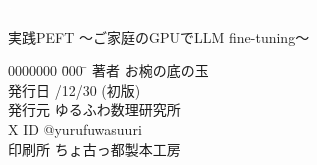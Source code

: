 \documentclass[a5paper,twoside,dvipdfmx]{jsarticle}
\begin{document}
\newpage

\thispagestyle{empty} 

\textcolor{white}{.}
\vspace{\baselineskip}
\vspace{\baselineskip}
\vspace{\baselineskip}
\vspace{\baselineskip}
\vspace{\baselineskip}
\vspace{\baselineskip}
\vspace{\baselineskip}
\vspace{\baselineskip}
\vspace{\baselineskip}
\vspace{\baselineskip}
\vspace{\baselineskip}
\vspace{\baselineskip}
\vspace{\baselineskip}
\vspace{\baselineskip}
\vspace{\baselineskip}
\vspace{\baselineskip}
\vspace{\baselineskip}
\begin{screen}

実践PEFT ～ご家庭のGPUでLLM fine-tuning～

\begin{tabbing}
  0000000 \= 000 \= \kill
  著者 \> お椀の底の玉 \\
  発行日 /12/30 (初版) \\
  発行元 \> ゆるふわ数理研究所　\\
  X ID \> @yurufuwasuuri \\
  印刷所 \> ちょ古っ都製本工房
\end{tabbing}

\end{screen}

\vspace{\baselineskip}



\end{document}
